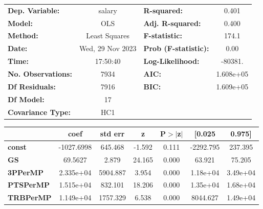 \begin{center}
\begin{tabular}{lclc}
\toprule
\textbf{Dep. Variable:}             &      salary      & \textbf{  R-squared:         } &     0.401   \\
\textbf{Model:}                     &       OLS        & \textbf{  Adj. R-squared:    } &     0.400   \\
\textbf{Method:}                    &  Least Squares   & \textbf{  F-statistic:       } &     174.1   \\
\textbf{Date:}                      & Wed, 29 Nov 2023 & \textbf{  Prob (F-statistic):} &     0.00    \\
\textbf{Time:}                      &     17:50:40     & \textbf{  Log-Likelihood:    } &   -80381.   \\
\textbf{No. Observations:}          &        7934      & \textbf{  AIC:               } & 1.608e+05   \\
\textbf{Df Residuals:}              &        7916      & \textbf{  BIC:               } & 1.609e+05   \\
\textbf{Df Model:}                  &          17      & \textbf{                     } &             \\
\textbf{Covariance Type:}           &       HC1        & \textbf{                     } &             \\
\bottomrule
\end{tabular}
\begin{tabular}{lcccccc}
                                    & \textbf{coef} & \textbf{std err} & \textbf{z} & \textbf{P$> |$z$|$} & \textbf{[0.025} & \textbf{0.975]}  \\
\midrule
\textbf{const}                      &   -1027.6998  &      645.468     &    -1.592  &         0.111        &    -2292.795    &      237.395     \\
\textbf{GS}                         &      69.5627  &        2.879     &    24.165  &         0.000        &       63.921    &       75.205     \\
\textbf{3PPerMP}                    &    2.335e+04  &     5904.887     &     3.954  &         0.000        &     1.18e+04    &     3.49e+04     \\
\textbf{PTSPerMP}                   &    1.515e+04  &      832.101     &    18.206  &         0.000        &     1.35e+04    &     1.68e+04     \\
\textbf{TRBPerMP}                   &    1.149e+04  &     1757.329     &     6.538  &         0.000        &     8044.627    &     1.49e+04     \\

\end{tabular}
\end{center}
